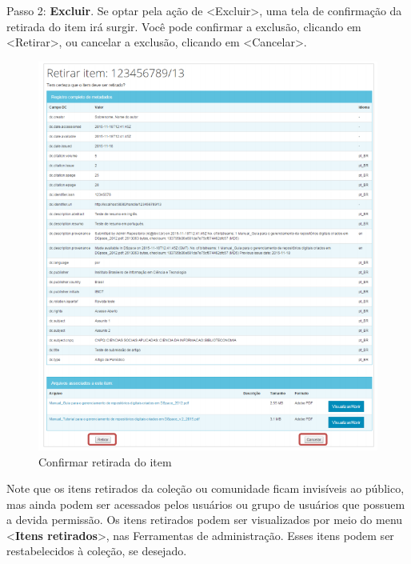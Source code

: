 \documentclass[12pt,hidelinks]{article}
\begin{document}
\newpage

    Passo 2: \textbf{Excluir}. Se optar pela ação de <Excluir>, uma tela de confirmação da retirada do item irá surgir. Você pode confirmar a exclusão, clicando em <Retirar>, ou cancelar a exclusão, clicando em <Cancelar>.
    
    \begin{figure}[!htp]
                \centering
                \includegraphics[scale=0.8]{figura/Figura101.png}
                \caption{Confirmar retirada do item}
            \label{Rotulo}
        \end{figure}
    
    Note que os itens retirados da coleção ou comunidade ficam invisíveis ao público, mas ainda podem ser acessados pelos usuários ou grupo de usuários que possuem a devida permissão. Os itens retirados podem ser visualizados por meio do menu <\textbf{Itens retirados}>, nas Ferramentas de administração. Esses itens podem ser restabelecidos à coleção, se desejado.

\newpage
\end{document}
